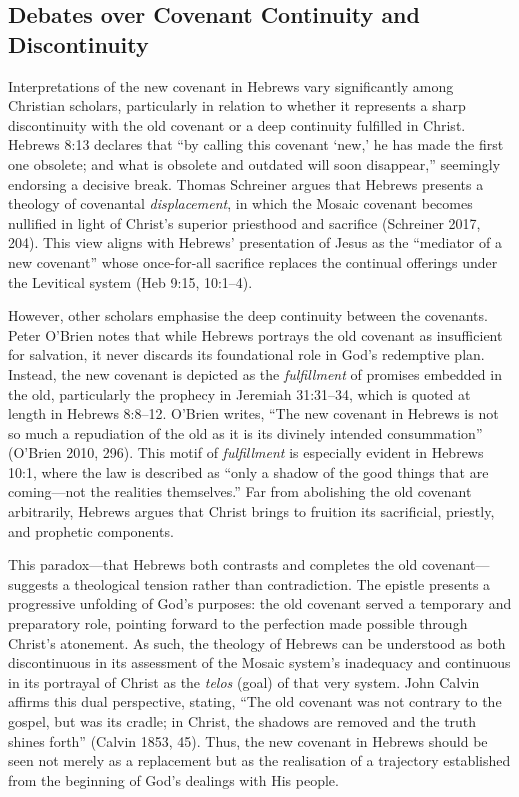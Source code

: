 \documentclass[12pt]{article}
\begin{document}
\subsection{Debates over Covenant Continuity and Discontinuity}
Interpretations of the new covenant in Hebrews vary significantly among
Christian scholars, particularly in relation to whether it represents a sharp
discontinuity with the old covenant or a deep continuity fulfilled in Christ.
Hebrews 8:13 declares that “by calling this covenant ‘new,’ he has made the
first one obsolete; and what is obsolete and outdated will soon disappear,”
seemingly endorsing a decisive break. Thomas Schreiner argues that Hebrews
presents a theology of covenantal \emph{displacement}, in which the Mosaic
covenant becomes nullified in light of Christ’s superior priesthood and
sacrifice (Schreiner 2017, 204). This view aligns with Hebrews’ presentation of
Jesus as the “mediator of a new covenant” whose once-for-all sacrifice replaces
the continual offerings under the Levitical system (Heb 9:15, 10:1–4).

However, other scholars emphasise the deep continuity between the covenants.
Peter O’Brien notes that while Hebrews portrays the old covenant as insufficient
for salvation, it never discards its foundational role in God’s redemptive plan.
Instead, the new covenant is depicted as the \emph{fulfillment} of promises
embedded in the old, particularly the prophecy in Jeremiah 31:31–34, which is
quoted at length in Hebrews 8:8–12. O’Brien writes, “The new covenant in Hebrews
is not so much a repudiation of the old as it is its divinely intended
consummation” (O’Brien 2010, 296). This motif of \emph{fulfillment} is
especially evident in Hebrews 10:1, where the law is described as “only a shadow
of the good things that are coming---not the realities themselves.” Far from
abolishing the old covenant arbitrarily, Hebrews argues that Christ brings to
fruition its sacrificial, priestly, and prophetic components.

This paradox---that Hebrews both contrasts and completes the old
covenant---suggests a theological tension rather than contradiction. The epistle
presents a progressive unfolding of God’s purposes: the old covenant served a
temporary and preparatory role, pointing forward to the perfection made possible
through Christ’s atonement. As such, the theology of Hebrews can be understood
as both discontinuous in its assessment of the Mosaic system’s inadequacy and
continuous in its portrayal of Christ as the \emph{telos} (goal) of that very
system.  John Calvin affirms this dual perspective, stating, “The old covenant
was not contrary to the gospel, but was its cradle; in Christ, the shadows are
removed and the truth shines forth” (Calvin 1853, 45). Thus, the new covenant in
Hebrews should be seen not merely as a replacement but as the realisation of a
trajectory established from the beginning of God's dealings with His people.
\end{document}
